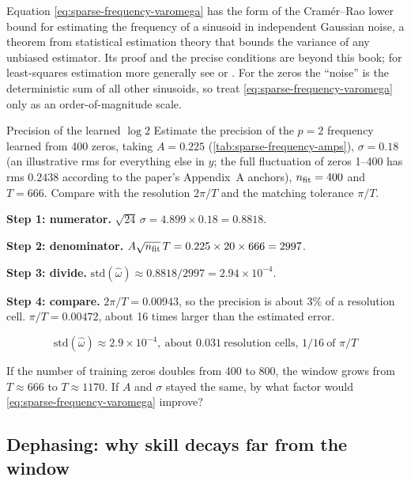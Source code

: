 \begin{beyond}
Equation \eqref{eq:sparse-frequency-varomega} has the form of the Cram\'er--Rao lower bound for estimating the frequency of a sinusoid in independent Gaussian noise, a theorem from statistical estimation theory that bounds the variance of any unbiased estimator. Its proof and the precise conditions are beyond this book; for least-squares estimation more generally see \cite{nr} or \cite{esl}. For the zeros the ``noise'' is the deterministic sum of all other sinusoids, so treat \eqref{eq:sparse-frequency-varomega} only as an order-of-magnitude scale.
\end{beyond}

\begin{sample}{Precision of the learned $\log 2$}
Estimate the precision of the $p=2$ frequency learned from 400 zeros, taking $A=0.225$ (\cref{tab:sparse-frequency-amps}), $\sigma=0.18$ (an illustrative rms for everything else in $y$; the full fluctuation of zeros 1--400 has rms $0.2438$ according to the paper's Appendix~A anchors), $n_{\rm fit}=400$ and $T=666$. Compare with the resolution $2\pi/T$ and the matching tolerance $\pi/T$.

\textbf{Step 1: numerator.} $\sqrt{24}\,\sigma=4.899\times0.18=0.8818$.

\textbf{Step 2: denominator.} $A\sqrt{n_{\rm fit}}\,T=0.225\times20\times666=2997$.

\textbf{Step 3: divide.} $\mathrm{std}(\widehat\omega)\approx0.8818/2997=2.94\times10^{-4}$.

\textbf{Step 4: compare.} $2\pi/T=0.00943$, so the precision is about $3\%$ of a resolution cell. $\pi/T=0.00472$, about 16 times larger than the estimated error.

$$\boxed{\mathrm{std}(\widehat\omega)\approx2.9\times10^{-4},\ \text{about }0.031\ \text{resolution cells, }1/16\ \text{of }\pi/T}$$
\end{sample}

\begin{checkpoint}
If the number of training zeros doubles from 400 to 800, the window grows from $T\approx666$ to $T\approx1170$. If $A$ and $\sigma$ stayed the same, by what factor would \eqref{eq:sparse-frequency-varomega} improve?
\end{checkpoint}

\subsection{Dephasing: why skill decays far from the window}

